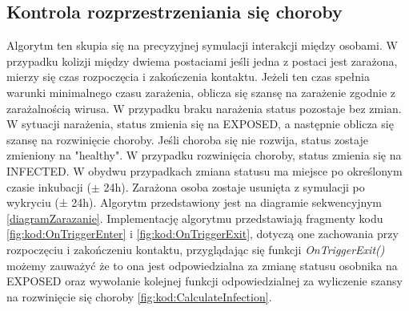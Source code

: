 \subsection{Kontrola rozprzestrzeniania się choroby}
Algorytm ten skupia się na precyzyjnej symulacji interakcji między osobami. W przypadku kolizji między dwiema postaciami jeśli jedna z postaci jest zarażona, mierzy się czas rozpoczęcia i zakończenia kontaktu. Jeżeli ten czas spełnia warunki minimalnego czasu zarażenia, oblicza się szansę na zarażenie zgodnie z zarażalnością wirusa. W przypadku braku narażenia status pozostaje bez zmian. W sytuacji narażenia, status zmienia się na EXPOSED, a następnie oblicza się szansę na rozwinięcie choroby. Jeśli choroba się nie rozwija, status zostaje zmieniony na "healthy". W przypadku rozwinięcia choroby, status zmienia się na INFECTED. W obydwu przypadkach zmiana statusu ma miejsce po określonym czasie inkubacji ($\pm$ 24h). Zarażona osoba zostaje usunięta z symulacji po wykryciu (± 24h). Algorytm przedstawiony jest na diagramie sekwencyjnym \ref{diagramZarazanie}. Implementację algorytmu przedstawiają fragmenty kodu \ref{fig:kod:OnTriggerEnter} i \ref{fig:kod:OnTriggerExit}, dotyczą one zachowania przy rozpoczęciu i zakończeniu kontaktu, przyglądając się funkcji \textit{OnTriggerExit()} możemy zauważyć że to ona jest odpowiedzialna za zmianę statusu osobnika na EXPOSED oraz wywołanie kolejnej funkcji odpowiedzialnej za wyliczenie szansy na rozwinięcie się choroby \ref{fig:kod:CalculateInfection}.

